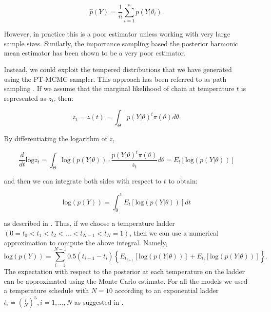 $$\hat{p}(Y) = \frac{1}{n}\sum_{i=1}^{n}p(Y|\theta_i).$$

However, in practice this is a poor estimator unless working with very large sample sizes. Similarly, the importance sampling based the posterior harmonic mean estimator has been shown \cite{girolami08b, meng96} to be a very poor estimator. 

Instead, we could exploit the tempered distributions that we have generated using the PT-MCMC sampler. This approach has been referred to as path sampling \cite{meng96, meng98}. If we assume that the marginal likelihood of chain at temperature $t$ is represented as $z_t$, then:


$$z_t = z(t) = \int_{\Theta} p(Y|\theta)^{t}\pi(\theta) d\theta .$$

By differentiating the logarithm of $z$,

$$\frac{d}{dt}\text{log}z_t = \int_{\Theta}\text{log}(p(Y|\theta)) \cdot \frac{p(Y|\theta)^t \pi(\theta)}{z_t} d\theta = E_t[\text{log}(p(Y|\theta))]$$

and then we can integrate both sides with respect to $t$ to obtain:

$$\text{log}(p(Y)) = \int_{0}^{1}E_t[\text{log}(p(Y|\theta))]dt$$ 

as described in \cite{girolami08a}. Thus, if we choose a temperature ladder $(0 = t_0 < t_1 < t_2 < ... < t_{N-1} < t_N = 1)$, then we can use a numerical approximation to compute the above integral. Namely, 
$$\text{log}(p(Y)) = \sum_{i=1}^{N-1}0.5(t_{i+1} - t_i)\left \{ E_{t_{i+1}}[\text{log}(p(Y|\theta))] + E_{t_{i}}[\text{log}(p(Y|\theta))] \right \}.$$
The expectation with respect to the posterior at each temperature on the ladder can be approximated using the Monte Carlo estimate. For all the models we used a temperature schedule with $N = 10$ according to an exponential ladder $t_i = (\frac{i}{N})^5, i = 1, ..., N$ as suggested in \cite{calderhead10}.

